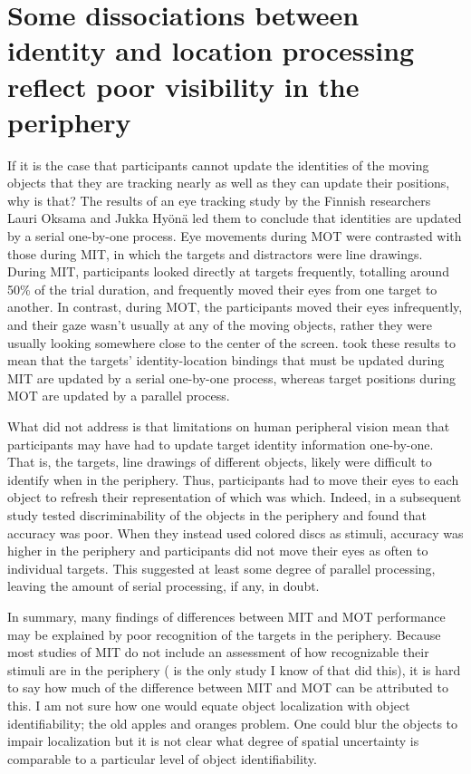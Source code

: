 \documentclass[
]{book}
\begin{document}
\hypertarget{some-dissociations-between-identity-and-location-processing-reflect-poor-visibility-in-the-periphery}{%
\section{Some dissociations between identity and location processing reflect poor visibility in the periphery}\label{some-dissociations-between-identity-and-location-processing-reflect-poor-visibility-in-the-periphery}}

If it is the case that participants cannot update the identities of the moving objects that they are tracking nearly as well as they can update their positions, why is that? The results of an eye tracking study by the Finnish researchers Lauri Oksama and Jukka Hyönä led them to conclude that identities are updated by a serial one-by-one process. Eye movements during MOT were contrasted with those during MIT, in which the targets and distractors were line drawings. During MIT, participants looked directly at targets frequently, totalling around 50\% of the trial duration, and frequently moved their eyes from one target to another. In contrast, during MOT, the participants moved their eyes infrequently, and their gaze wasn't usually at any of the moving objects, rather they were usually looking somewhere close to the center of the screen. \citet{oksamaPositionTrackingIdentity2016} took these results to mean that the targets' identity-location bindings that must be updated during MIT are updated by a serial one-by-one process, whereas target positions during MOT are updated by a parallel process.

What \citet{oksamaPositionTrackingIdentity2016} did not address is that limitations on human peripheral vision mean that participants may have had to update target identity information one-by-one. That is, the targets, line drawings of different objects, likely were difficult to identify when in the periphery. Thus, participants had to move their eyes to each object to refresh their representation of which was which. Indeed, in a subsequent study \citet{liModelMultipleIdentity2019} tested discriminability of the objects in the periphery and found that accuracy was poor.
When they instead used colored discs as stimuli, accuracy was higher in the periphery and participants did not move their eyes as often to individual targets. This suggested at least some degree of parallel processing, leaving the amount of serial processing, if any, in doubt.

In summary, many findings of differences between MIT and MOT performance may be explained by poor recognition of the targets in the periphery. Because most studies of MIT do not include an assessment of how recognizable their stimuli are in the periphery (\citet{liModelMultipleIdentity2019} is the only study I know of that did this), it is hard to say how much of the difference between MIT and MOT can be attributed to this. I am not sure how one would equate object localization with object identifiability; the old apples and oranges problem. One could blur the objects to impair localization but it is not clear what degree of spatial uncertainty is comparable to a particular level of object identifiability.
\end{document}
